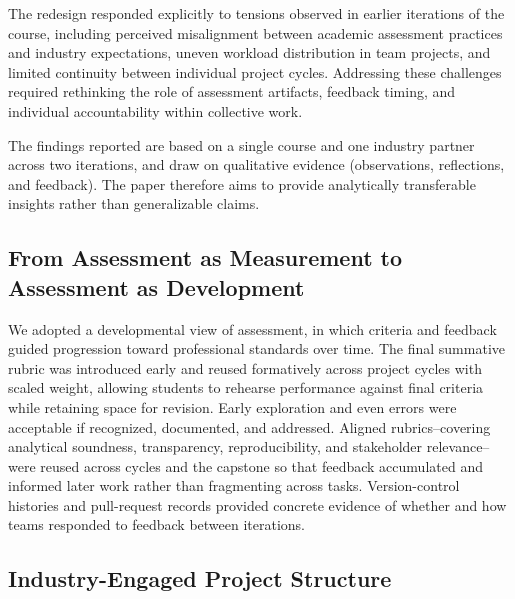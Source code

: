 The redesign responded explicitly to tensions observed in earlier iterations of the course, including perceived misalignment between academic assessment practices and industry expectations, uneven workload distribution in team projects, and limited continuity between individual project cycles. Addressing these challenges required rethinking the role of assessment artifacts, feedback timing, and individual accountability within collective work.

The findings reported are based on a single course and one industry partner across two iterations, and draw on qualitative evidence (observations, reflections, and feedback). The paper therefore aims to provide analytically transferable insights rather than generalizable claims.


\subsection{From Assessment as Measurement to Assessment as Development}

We adopted a developmental view of assessment, in which criteria and feedback guided progression toward professional standards over time. The final summative rubric was introduced early and reused formatively across project cycles with scaled weight, allowing students to rehearse performance against final criteria while retaining space for revision. Early exploration and even errors were acceptable if recognized, documented, and addressed. Aligned rubrics--covering analytical soundness, transparency, reproducibility, and stakeholder relevance--were reused across cycles and the capstone so that feedback accumulated and informed later work rather than fragmenting across tasks. Version-control histories and pull-request records provided concrete evidence of whether and how teams responded to feedback between iterations.


\subsection{Industry-Engaged Project Structure}

